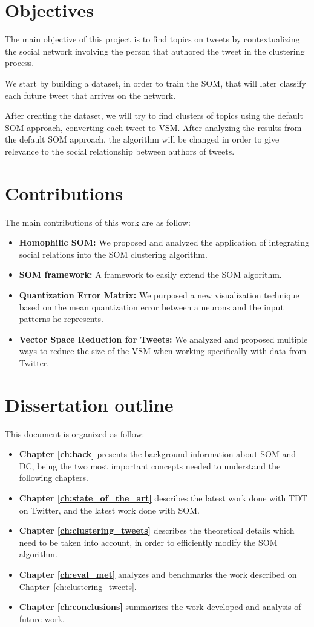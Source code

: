 \section{Objectives}
The main objective of this project is to find topics on tweets by contextualizing the social network involving the person that authored the tweet in the clustering process.

We start by building a dataset, in order to train the \ac{SOM}, that will later classify each future tweet that arrives on the network.

After creating the dataset, we will try to find clusters of topics using the default \ac{SOM} approach, converting each tweet to \ac{VSM}. After analyzing the results from the default \ac{SOM} approach, the algorithm will be changed in order to give relevance to the social relationship between authors of tweets.

\section{Contributions}
The main contributions of this work are as follow:
\begin{itemize}
  \item  \textbf{Homophilic SOM: } We proposed and analyzed the application of integrating social relations into the \ac{SOM} clustering algorithm.
  \item \textbf{SOM framework: } A framework to easily extend the \ac{SOM} algorithm.
  \item \textbf{Quantization Error Matrix: } We purposed a new visualization technique based on the mean quantization error between a neurons and the input patterns he represents. 
  \item \textbf{Vector Space Reduction for Tweets: } We analyzed and proposed multiple ways to reduce the size of the \ac{VSM} when working specifically with data from Twitter.
\end{itemize}

\section{Dissertation outline}
This document is organized as follow:
\begin{itemize}
  \item \textbf{Chapter \ref{ch:back}} presents the background information about \ac{SOM} and \ac{DC}, being the two most important concepts needed to understand the following chapters.  
  \item \textbf{Chapter \ref{ch:state_of_the_art}} describes the latest work done with \ac{TDT} on Twitter, and the latest work done with \ac{SOM}. 
  \item \textbf{Chapter \ref{ch:clustering_tweets}} describes the theoretical details which need to be taken into account, in order to efficiently modify the \ac{SOM} algorithm.
  \item \textbf{ Chapter \ref{ch:eval_met} } analyzes and benchmarks the work described on Chapter~\ref{ch:clustering_tweets}.
  \item \textbf{ Chapter \ref{ch:conclusions} } summarizes the work developed and analysis of future work.
\end{itemize}

\cleardoublepage 
